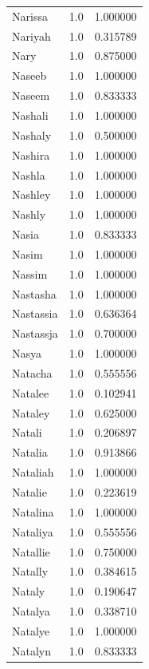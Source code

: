 \documentclass[
  letterpaper,
  DIV=11,
  numbers=noendperiod]{scrreprt}
\begin{document}
\begin{tabular}{lrr}
Narissa         &   1.0 &   1.000000 \\
Nariyah         &   1.0 &   0.315789 \\
Nary            &   1.0 &   0.875000 \\
Naseeb          &   1.0 &   1.000000 \\
Naseem          &   1.0 &   0.833333 \\
Nashali         &   1.0 &   1.000000 \\
Nashaly         &   1.0 &   0.500000 \\
Nashira         &   1.0 &   1.000000 \\
Nashla          &   1.0 &   1.000000 \\
Nashley         &   1.0 &   1.000000 \\
Nashly          &   1.0 &   1.000000 \\
Nasia           &   1.0 &   0.833333 \\
Nasim           &   1.0 &   1.000000 \\
Nassim          &   1.0 &   1.000000 \\
Nastasha        &   1.0 &   1.000000 \\
Nastassia       &   1.0 &   0.636364 \\
Nastassja       &   1.0 &   0.700000 \\
Nasya           &   1.0 &   1.000000 \\
Natacha         &   1.0 &   0.555556 \\
Natalee         &   1.0 &   0.102941 \\
Nataley         &   1.0 &   0.625000 \\
Natali          &   1.0 &   0.206897 \\
Natalia         &   1.0 &   0.913866 \\
Nataliah        &   1.0 &   1.000000 \\
Natalie         &   1.0 &   0.223619 \\
Natalina        &   1.0 &   1.000000 \\
Nataliya        &   1.0 &   0.555556 \\
Natallie        &   1.0 &   0.750000 \\
Natally         &   1.0 &   0.384615 \\
Nataly          &   1.0 &   0.190647 \\
Natalya         &   1.0 &   0.338710 \\
Natalye         &   1.0 &   1.000000 \\
Natalyn         &   1.0 &   0.833333 \\

\end{tabular}
\end{document}
